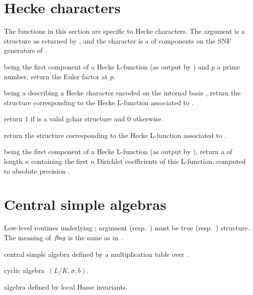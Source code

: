 \section{Hecke characters}

The functions in this section are specific to Hecke characters. The
argument  is a  structure as returned by
, and the character  is a 
of components on the SNF generators of .

  being the
first component of a Hecke L-function  (as output by
) and $p$ a prime number, return the Euler factor
at $p$.

  being a
 describing a Hecke character encoded on the internal
basis , return the 
structure corresponding to the Hecke L-function associated to .

 return $1$ if  is a valid
gchar structure and $0$ otherwise.

 return the  structure
corresponding to the Hecke L-function associated to .

  being the
first component of a Hecke L-function  (as output by
), return a  of length $n$ containing the
first $n$ Dirichlet coefficients of this L-function, computed to
absolute precision .

\section{Central simple algebras}


Low-level routines underlying ; argument  (resp.~)
must be true  (resp.~) structure. The meaning of~$\hbox{\it f\kern0pt lag\/}$ is the
same as in~.

central simple algebra defined by a multiplication table over .

cyclic algebra~$(L/K,\sigma,b)$.

algebra defined by local Hasse invariants.

